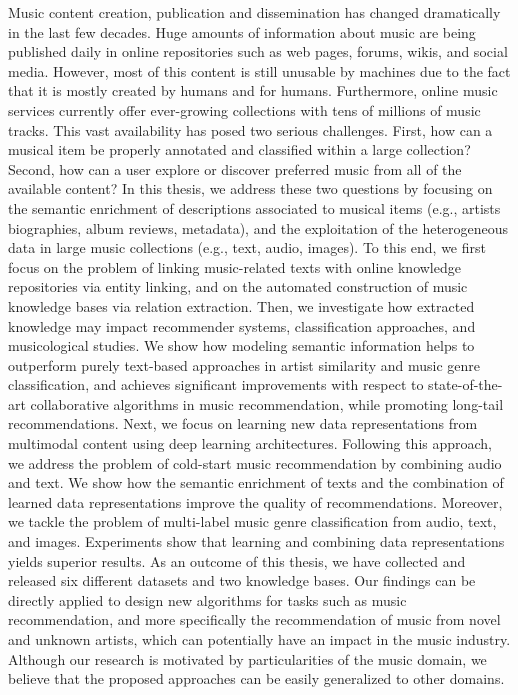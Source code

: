 Music content creation, publication and dissemination has changed dramatically in the last few decades. Huge amounts of information about music are being published daily in online repositories such as web pages, forums, wikis, and social media. However, most of this content is still unusable by machines due to the fact that it is mostly created by humans and for humans. Furthermore, online music services currently offer ever-growing collections with tens of millions of music tracks. This vast availability has posed two serious challenges. First, how can a musical item be properly annotated and classified within a large collection? Second, how can a user explore or discover preferred music from all of the available content? In this thesis, we address these two questions by focusing on the semantic enrichment of descriptions associated to musical items (e.g., artists biographies, album reviews, metadata), and the exploitation of the heterogeneous data in large music collections (e.g., text, audio, images). To this end, we first focus on the problem of linking music-related texts with online knowledge repositories via entity linking, and on the automated construction of music knowledge bases via relation extraction. Then, we investigate how extracted knowledge may impact recommender systems, classification approaches, and musicological studies. We show how modeling semantic information helps to outperform purely text-based approaches in artist similarity and music genre classification, and achieves significant improvements with respect to state-of-the-art collaborative algorithms in music recommendation, while promoting long-tail recommendations. Next, we focus on learning new data representations from multimodal content using deep learning architectures. Following this approach, we address the problem of cold-start music recommendation by combining audio and text. We show how the semantic enrichment of texts and the combination of learned data representations improve the quality of recommendations. Moreover, we tackle the problem of multi-label music genre classification from audio, text, and images. Experiments show that learning and combining data representations yields superior results. As an outcome of this thesis, we have collected and released six different datasets and two knowledge bases. Our findings can be directly applied to design new algorithms for tasks such as music recommendation, and more specifically the recommendation of music from novel and unknown artists, which can potentially have an impact in the music industry. Although our research is motivated by particularities of the music domain, we believe that the proposed approaches can be easily generalized to other domains.
